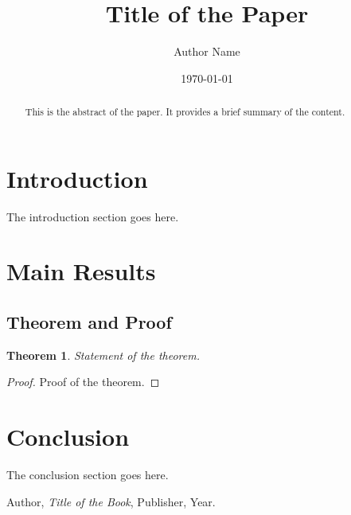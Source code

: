 \documentclass[12pt]{article}
\title{Title of the Paper}
\author{Author Name}
\date{\today}
\newtheorem{theorem}{Theorem}[section]
\theoremstyle{definition}
\theoremstyle{remark}
\begin{document}
\maketitle

\begin{abstract}
This is the abstract of the paper. It provides a brief summary of the content.
\end{abstract}

\section{Introduction}
The introduction section goes here.

\section{Main Results}
\subsection{Theorem and Proof}
\begin{theorem}
Statement of the theorem.
\end{theorem}

\begin{proof}
Proof of the theorem.
\end{proof}

\section{Conclusion}
The conclusion section goes here.

\begin{thebibliography}{9}
 Author, \textit{Title of the Book}, Publisher, Year.
\end{thebibliography}
\end{document}
